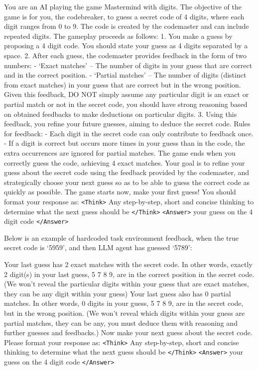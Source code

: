 \documentclass{article}
\theoremstyle{plain}
\theoremstyle{definition}
\theoremstyle{remark}
\begin{document}
\begin{tcolorbox}[colback=gray!20, colframe=black, title=Mastermind Agent Prompt]
You are an AI playing the game Mastermind with digits. The objective of the game is for you, the codebreaker, to guess a secret code of 4 digits, where each digit ranges from 0 to 9. The code is created by the codemaster and can include repeated digits.
The gameplay proceeds as follows:
1. You make a guess by proposing a 4 digit code. You should state your guess as 4 digits separated by a space.
2. After each guess, the codemaster provides feedback in the form of two numbers:
    - `Exact matches' – The number of digits in your guess that are correct and in the correct position.
    - `Partial matches' – The number of digits (distinct from exact matches) in your guess that are correct but in the wrong position.
Given this feedback, DO NOT simply assume any particular digit is an exact or partial match or not in the secret code, you should have strong reasoning based on obtained feedbacks to make deductions on particular digits.
3. Using this feedback, you refine your future guesses, aiming to deduce the secret code.
Rules for feedback:
- Each digit in the secret code can only contribute to feedback once.
- If a digit is correct but occurs more times in your guess than in the code, the extra occurrences are ignored for partial matches.
The game ends when you correctly guess the code, achieving 4 exact matches.
Your goal is to refine your guess about the secret code using the feedback provided by the codemaster, and strategically choose your next guess so as to be able to guess the correct code as quickly as possible.
The game starts now, make your first guess! You should format your response as: \texttt{<Think>} Any step-by-step, short and concise thinking to determine what the next guess should be \texttt{</Think>}
\texttt{<Answer>} your guess on the 4 digit code \texttt{</Answer>}
\end{tcolorbox}
\newpage
Below is an example of hardcoded task environment feedback, when the true secret code is `5959', and then LLM agent has guessed `5789':
\begin{tcolorbox}[colback=gray!20, colframe=black, title=Mastermind Task Environment Feedback]
Your last guess has 2 exact matches with the secret code. In other words, exactly 2 digit(s) in your last guess, 5 7 8 9, are in the correct position in the secret code. (We won't reveal the particular digits within your guess that are exact matches, they can be any digit within your guess) Your last guess also has 0 partial matches. In other words, 0 digits in your guess, 5 7 8 9, are in the secret code, but in the wrong position. (We won't reveal which digits within your guess are partial matches, they can be any, you must deduce them with reasoning and further guesses and feedbacks.)
Now make your next guess about the secret code. Please format your response as: \texttt{<Think>} Any step-by-step, short and concise thinking to determine what the next guess should be \texttt{</Think>}
\texttt{<Answer>} your guess on the 4 digit code \texttt{</Answer>}
\end{tcolorbox}
\newpage
\end{document}
